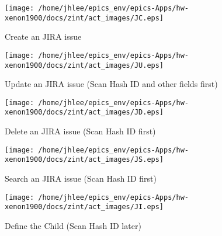 \noindent
\vspace{1.4cm}
\begin{minipage}{.2\textwidth}
\begin{center}
\texttt{[image: /home/jhlee/epics\_env/epics-Apps/hw-xenon1900/docs/zint/act\_images/JC.eps]}
\end{center}
\end{minipage}
\begin{minipage}{.7\textwidth}
Create an JIRA issue 
\end{minipage}


\noindent
\vspace{1.4cm}
\begin{minipage}{.2\textwidth}
\begin{center}
\texttt{[image: /home/jhlee/epics\_env/epics-Apps/hw-xenon1900/docs/zint/act\_images/JU.eps]}
\end{center}
\end{minipage}
\begin{minipage}{.7\textwidth}
Update an JIRA issue (Scan Hash ID and other fields first)
\end{minipage}


\noindent
\vspace{1.4cm}
\begin{minipage}{.2\textwidth}
\begin{center}
\texttt{[image: /home/jhlee/epics\_env/epics-Apps/hw-xenon1900/docs/zint/act\_images/JD.eps]}
\end{center}
\end{minipage}
\begin{minipage}{.7\textwidth}
Delete an JIRA issue (Scan Hash ID first)
\end{minipage}


\noindent
\vspace{1.4cm}
\begin{minipage}{.2\textwidth}
\begin{center}
\texttt{[image: /home/jhlee/epics\_env/epics-Apps/hw-xenon1900/docs/zint/act\_images/JS.eps]}
\end{center}
\end{minipage}
\begin{minipage}{.7\textwidth}
Search an JIRA issue (Scan Hash ID first)
\end{minipage}


\noindent
\vspace{1.4cm}
\begin{minipage}{.2\textwidth}
\begin{center}
\texttt{[image: /home/jhlee/epics\_env/epics-Apps/hw-xenon1900/docs/zint/act\_images/JI.eps]}
\end{center}
\end{minipage}
\begin{minipage}{.7\textwidth}
Define the Child (Scan Hash ID later)
\end{minipage}


